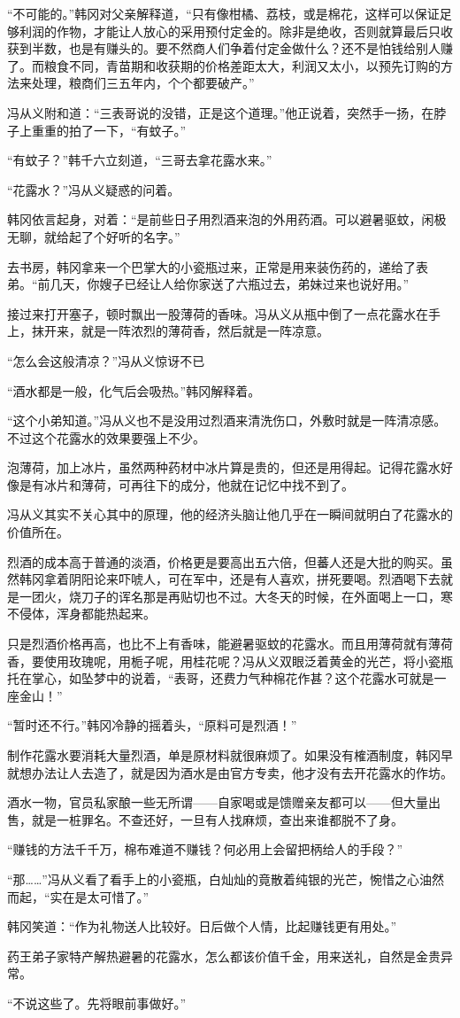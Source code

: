 “不可能的。”韩冈对父亲解释道，“只有像柑橘、荔枝，或是棉花，这样可以保证足够利润的作物，才能让人放心的采用预付定金的。除非是绝收，否则就算最后只收获到半数，也是有赚头的。要不然商人们争着付定金做什么？还不是怕钱给别人赚了。而粮食不同，青苗期和收获期的价格差距太大，利润又太小，以预先订购的方法来处理，粮商们三五年内，个个都要破产。”

冯从义附和道：“三表哥说的没错，正是这个道理。”他正说着，突然手一扬，在脖子上重重的拍了一下，“有蚊子。”

“有蚊子？”韩千六立刻道，“三哥去拿花露水来。”

“花露水？”冯从义疑惑的问着。

韩冈依言起身，对着：“是前些日子用烈酒来泡的外用药酒。可以避暑驱蚊，闲极无聊，就给起了个好听的名字。”

去书房，韩冈拿来一个巴掌大的小瓷瓶过来，正常是用来装伤药的，递给了表弟。“前几天，你嫂子已经让人给你家送了六瓶过去，弟妹过来也说好用。”

接过来打开塞子，顿时飘出一股薄荷的香味。冯从义从瓶中倒了一点花露水在手上，抹开来，就是一阵浓烈的薄荷香，然后就是一阵凉意。

“怎么会这般清凉？”冯从义惊讶不已

“酒水都是一般，化气后会吸热。”韩冈解释着。

“这个小弟知道。”冯从义也不是没用过烈酒来清洗伤口，外敷时就是一阵清凉感。不过这个花露水的效果要强上不少。

泡薄荷，加上冰片，虽然两种药材中冰片算是贵的，但还是用得起。记得花露水好像是有冰片和薄荷，可再往下的成分，他就在记忆中找不到了。

冯从义其实不关心其中的原理，他的经济头脑让他几乎在一瞬间就明白了花露水的价值所在。

烈酒的成本高于普通的淡酒，价格更是要高出五六倍，但蕃人还是大批的购买。虽然韩冈拿着阴阳论来吓唬人，可在军中，还是有人喜欢，拼死要喝。烈酒喝下去就是一团火，烧刀子的诨名那是再贴切也不过。大冬天的时候，在外面喝上一口，寒不侵体，浑身都能热起来。

只是烈酒价格再高，也比不上有香味，能避暑驱蚊的花露水。而且用薄荷就有薄荷香，要使用玫瑰呢，用栀子呢，用桂花呢？冯从义双眼泛着黄金的光芒，将小瓷瓶托在掌心，如坠梦中的说着，“表哥，还费力气种棉花作甚？这个花露水可就是一座金山！”

“暂时还不行。”韩冈冷静的摇着头，“原料可是烈酒！”

制作花露水要消耗大量烈酒，单是原材料就很麻烦了。如果没有榷酒制度，韩冈早就想办法让人去造了，就是因为酒水是由官方专卖，他才没有去开花露水的作坊。

酒水一物，官员私家酿一些无所谓——自家喝或是馈赠亲友都可以——但大量出售，就是一桩罪名。不查还好，一旦有人找麻烦，查出来谁都脱不了身。

“赚钱的方法千千万，棉布难道不赚钱？何必用上会留把柄给人的手段？”

“那……”冯从义看了看手上的小瓷瓶，白灿灿的竟散着纯银的光芒，惋惜之心油然而起，“实在是太可惜了。”

韩冈笑道：“作为礼物送人比较好。日后做个人情，比起赚钱更有用处。”

药王弟子家特产解热避暑的花露水，怎么都该价值千金，用来送礼，自然是金贵异常。

“不说这些了。先将眼前事做好。”

